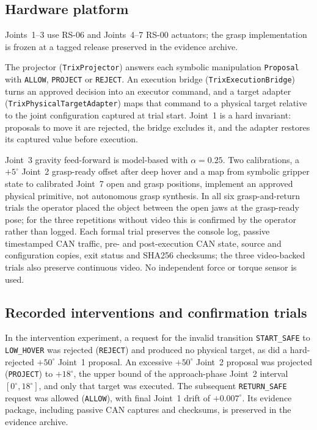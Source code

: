 \documentclass[10pt]{article}
\begin{document}
\subsection{Hardware platform}
Joints~1--3 use RS-06 and Joints~4--7 RS-00 actuators; the grasp implementation is frozen
at a tagged release preserved in the evidence archive.

{\raggedright The projector (\mbox{\texttt{TrixProjector}}) answers each symbolic manipulation \texttt{Proposal} with \texttt{ALLOW}, \texttt{PROJECT} or \texttt{REJECT}. An execution bridge (\mbox{\texttt{TrixExecutionBridge}}) turns an approved decision into an executor command, and a target adapter (\mbox{\texttt{TrixPhysicalTargetAdapter}}) maps that command to a physical target relative to the joint configuration captured at trial start. Joint~1 is a hard invariant: proposals to move it are rejected, the bridge excludes it, and the adapter restores its captured value before execution.\par}

Joint~3 gravity feed-forward is model-based with \(\alpha=0.25\). Two calibrations, a \(+5^\circ\) Joint~2 grasp-ready offset after deep hover and a
map from symbolic gripper state to calibrated Joint~7 open and grasp positions,
implement an approved physical primitive, not autonomous grasp synthesis. In
all six grasp-and-return trials the operator placed the object between the open
jaws at the grasp-ready pose; for the three repetitions without video this is confirmed by the operator rather than logged. Each formal trial preserves the console log,
passive timestamped CAN traffic, pre- and post-execution CAN state, source and configuration copies, exit status and SHA256 checksums; the three video-backed trials also preserve continuous video.
No independent force or torque sensor is used.

\subsection{Recorded interventions and confirmation trials}

In the intervention experiment, a request for the invalid transition \texttt{START\_SAFE} to \texttt{LOW\_HOVER} was rejected (\texttt{REJECT}) and produced no physical target, as did a hard-rejected \(+50^\circ\) Joint~1 proposal. An excessive \(+50^\circ\) Joint~2 proposal was projected (\texttt{PROJECT}) to \(+18^\circ\), the upper bound of the approach-phase Joint~2 interval \([0^\circ,18^\circ]\), and only that target was executed. The subsequent \texttt{RETURN\_SAFE} request was allowed (\texttt{ALLOW}), with final Joint~1 drift of
\(+0.007^\circ\). Its evidence package, including passive CAN captures and checksums, is
preserved in the evidence archive.
\end{document}
